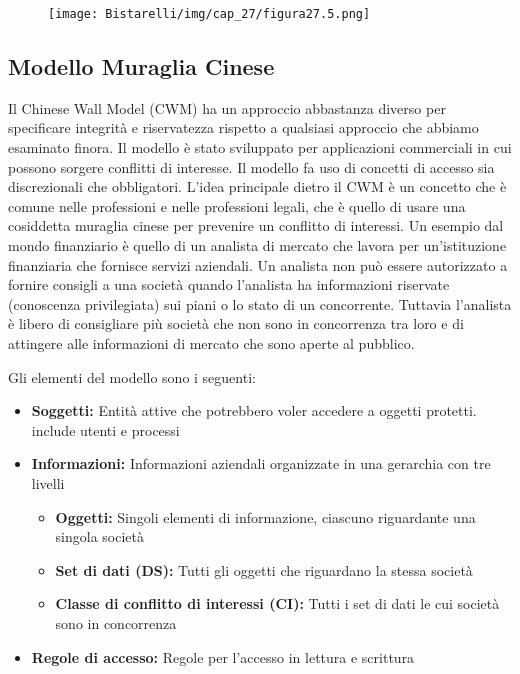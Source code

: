 \begin{figure}[H]
	\centering
    \texttt{[image: Bistarelli/img/cap\_27/figura27.5.png]}
\end{figure}


\newpage
\subsection{Modello Muraglia Cinese}
Il Chinese Wall Model (CWM) ha un approccio abbastanza diverso per specificare integrità e riservatezza rispetto a qualsiasi approccio che abbiamo esaminato finora. Il modello è stato sviluppato per applicazioni commerciali in cui possono sorgere conflitti di interesse. Il modello fa uso di concetti di accesso sia discrezionali che obbligatori. L'idea principale dietro il CWM è un concetto che è comune nelle professioni e nelle professioni legali, che è quello di usare una cosiddetta muraglia cinese per prevenire un conflitto di interessi. Un esempio dal mondo finanziario è quello di un analista di mercato che lavora per un'istituzione finanziaria che fornisce servizi aziendali. Un analista non può essere autorizzato a fornire consigli a una società quando l'analista ha informazioni riservate (conoscenza privilegiata) sui piani o lo stato di un concorrente. Tuttavia l'analista è libero di consigliare più società che non sono in concorrenza tra loro e di attingere alle informazioni di mercato che sono aperte al pubblico. 

\singlespacing

Gli elementi del modello sono i seguenti:

\begin{itemize}
    \item \textbf{Soggetti:} Entità attive che potrebbero voler accedere a oggetti protetti. include utenti e processi

    \item \textbf{Informazioni:} Informazioni aziendali organizzate in una gerarchia con tre livelli
    
    \begin{itemize}
        \item \textbf{Oggetti:} Singoli elementi di informazione, ciascuno riguardante una singola società
        
        \item \textbf{Set di dati (DS):} Tutti gli oggetti che riguardano la stessa società
        
        \item \textbf{Classe di conflitto di interessi (CI):} Tutti i set di dati le cui società sono in concorrenza

    \end{itemize}
    \item \textbf{Regole di accesso:} Regole per l'accesso in lettura e scrittura
\end{itemize}

